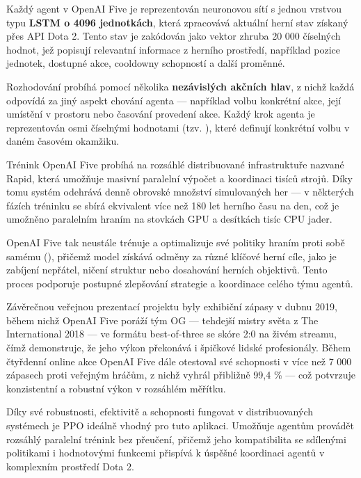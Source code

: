 Každý agent v OpenAI Five je reprezentován neuronovou sítí s jednou vrstvou typu \textbf{LSTM o 4096 jednotkách}, která zpracovává aktuální herní stav získaný přes API Dota 2. Tento stav je zakódován jako vektor zhruba 20 000 číselných hodnot, jež popisují relevantní informace z herního prostředí, například pozice jednotek, dostupné akce, cooldowny schopností a další proměnné.

Rozhodování probíhá pomocí několika \textbf{nezávislých akčních hlav}, z nichž každá odpovídá za jiný aspekt chování agenta — například volbu konkrétní akce, její umístění v prostoru nebo časování provedení akce. Každý krok agenta je reprezentován osmi číselnými hodnotami (tzv. ), které definují konkrétní volbu v daném časovém okamžiku.

Trénink OpenAI Five probíhá na rozsáhlé distribuované infrastruktuře nazvané Rapid, která umožňuje masivní paralelní výpočet a koordinaci tisíců strojů. Díky tomu systém odehrává denně obrovské množství simulovaných her — v některých fázích tréninku se sbírá ekvivalent více než 180 let herního času na den, což je umožněno paralelním hraním  na stovkách GPU a desítkách tisíc CPU jader.

\newpage

OpenAI Five tak neustále trénuje a optimalizuje své politiky hraním proti sobě samému (), přičemž model získává odměny za různé klíčové herní cíle, jako je zabíjení nepřátel, ničení struktur nebo dosahování herních objektivů. Tento proces podporuje postupné zlepšování strategie a koordinace celého týmu agentů.

Závěrečnou veřejnou prezentací projektu byly exhibiční zápasy v dubnu 2019, během nichž OpenAI Five poráží tým OG — tehdejší mistry světa z The International 2018 — ve formátu best-of-three se skóre 2:0 na živém streamu, čímž demonstruje, že jeho výkon překonává i špičkové lidské profesionály. Během čtyřdenní online akce OpenAI Five dále otestoval své schopnosti v více než 7 000 zápasech proti veřejným hráčům, z nichž vyhrál přibližně 99{,}4 \% — což potvrzuje konzistentní a robustní výkon v rozsáhlém měřítku.

Díky své robustnosti, efektivitě a schopnosti fungovat v distribuovaných systémech je PPO ideálně vhodný pro tuto aplikaci. Umožňuje agentům provádět rozsáhlý paralelní trénink bez přeučení, přičemž jeho kompatibilita se sdílenými politikami i hodnotovými funkcemi přispívá k úspěšné koordinaci agentů v komplexním prostředí Dota 2.

